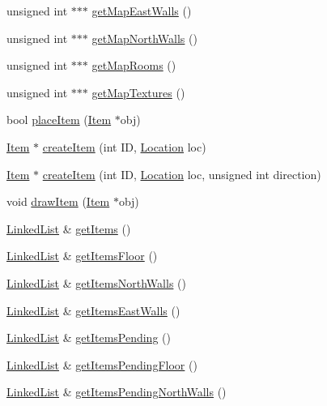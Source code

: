 \begin{DoxyCompactItemize}
unsigned int $\ast$$\ast$$\ast$ \hyperlink{classShipMaster_aae8c7eb8f14443c88607b45f41a1d844}{get\-Map\-East\-Walls} ()
\item 
unsigned int $\ast$$\ast$$\ast$ \hyperlink{classShipMaster_a9ced587d7eff477160077beb486dd697}{get\-Map\-North\-Walls} ()
\item 
unsigned int $\ast$$\ast$$\ast$ \hyperlink{classShipMaster_a59892b34be3b803dc72ab332b783ad2c}{get\-Map\-Rooms} ()
\item 
unsigned int $\ast$$\ast$$\ast$ \hyperlink{classShipMaster_a5d8b2504a339682a5928a41aa4e8727e}{get\-Map\-Textures} ()
\item 
bool \hyperlink{classShipMaster_aa9e9c11a116929e94bee491ab8dacf49}{place\-Item} (\hyperlink{classItem}{Item} $\ast$obj)
\item 
\hyperlink{classItem}{Item} $\ast$ \hyperlink{classShipMaster_a0e90a2352a439464d922d3fda25d71ca}{create\-Item} (int I\-D, \hyperlink{structLocation}{Location} loc)
\item 
\hyperlink{classItem}{Item} $\ast$ \hyperlink{classShipMaster_a07e5d7b5b90d5c5efc405175a3e93c3b}{create\-Item} (int I\-D, \hyperlink{structLocation}{Location} loc, unsigned int direction)
\item 
void \hyperlink{classShipMaster_ab378e743c7200449d2ac6d3b2c6c8f63}{draw\-Item} (\hyperlink{classItem}{Item} $\ast$obj)
\item 
\hyperlink{classLinkedList}{Linked\-List} \& \hyperlink{classShipMaster_a627afea5fc5988ad18c8a2dc4dcc7d91}{get\-Items} ()
\item 
\hyperlink{classLinkedList}{Linked\-List} \& \hyperlink{classShipMaster_acbf6f2dc0fa10c792f57c259bc0ba85a}{get\-Items\-Floor} ()
\item 
\hyperlink{classLinkedList}{Linked\-List} \& \hyperlink{classShipMaster_a00a16c26038f7607dde780dc8c4b4196}{get\-Items\-North\-Walls} ()
\item 
\hyperlink{classLinkedList}{Linked\-List} \& \hyperlink{classShipMaster_add7ed53360a58b16bb8b7815ee19e0d5}{get\-Items\-East\-Walls} ()
\item 
\hyperlink{classLinkedList}{Linked\-List} \& \hyperlink{classShipMaster_a28b969e9befa8df4df7fcf253aa3a119}{get\-Items\-Pending} ()
\item 
\hyperlink{classLinkedList}{Linked\-List} \& \hyperlink{classShipMaster_a3298f3e61dc07deaca57a568d9710dac}{get\-Items\-Pending\-Floor} ()
\item 
\hyperlink{classLinkedList}{Linked\-List} \& \hyperlink{classShipMaster_abc7ff7aa3b7ee6e600a3b048ed8c8cf6}{get\-Items\-Pending\-North\-Walls} ()

\end{DoxyCompactItemize}
